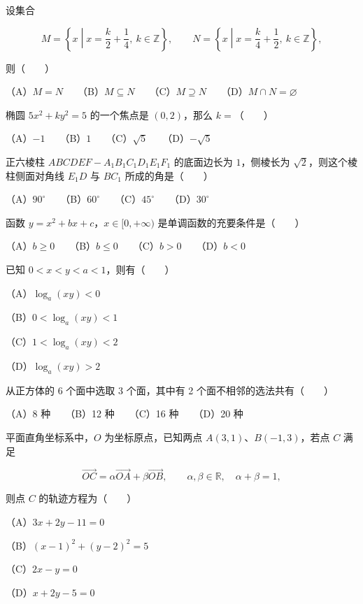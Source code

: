 \begin{question}
设集合

\nopagebreak[4]
\[
M=\left\{x\middle|x=\frac{k}{2}+\frac14,\ k\in\mathbb Z\right\},\qquad
N=\left\{x\middle|x=\frac{k}{4}+\frac12,\ k\in\mathbb Z\right\},
\]

则\mbox{（　　）}

（A）$M=N$　　（B）$M\subseteq N$　　（C）$M\supseteq N$　　（D）$M\cap N=\varnothing$

\end{question}
\begin{question}
椭圆 $5x^2+ky^2=5$ 的一个焦点是 $(0,2)$，那么 $k=$\mbox{（　　）}

（A）$-1$　　（B）$1$　　（C）$\sqrt5$　　（D）$-\sqrt5$

\end{question}
\begin{question}
正六棱柱 $ABCDEF-A_1B_1C_1D_1E_1F_1$ 的底面边长为 $1$，侧棱长为 $\sqrt2$，则这个棱柱侧面对角线 $E_1D$ 与 $BC_1$ 所成的角是\mbox{（　　）}

（A）$90^\circ$　　（B）$60^\circ$　　（C）$45^\circ$　　（D）$30^\circ$

\end{question}
\begin{question}
函数 $y=x^2+bx+c$，$x\in[0,+\infty)$ 是单调函数的充要条件是\mbox{（　　）}

（A）$b\geqslant0$　　（B）$b\leqslant0$　　（C）$b>0$　　（D）$b<0$

\end{question}
\begin{question}
已知 $0<x<y<a<1$，则有\mbox{（　　）}

（A）$\log_a(xy)<0$

（B）$0<\log_a(xy)<1$

（C）$1<\log_a(xy)<2$

（D）$\log_a(xy)>2$

\end{question}
\begin{question}
从正方体的 6 个面中选取 3 个面，其中有 2 个面不相邻的选法共有\mbox{（　　）}

（A）8 种　　（B）12 种　　（C）16 种　　（D）20 种

\end{question}
\begin{question}
平面直角坐标系中，$O$ 为坐标原点，已知两点 $A(3,1)\text{、}B(-1,3)$，若点 $C$ 满足

\nopagebreak[4]
\[
\overrightarrow{OC}=\alpha\overrightarrow{OA}+\beta\overrightarrow{OB},
\qquad \alpha,\beta\in\mathbb R,\quad \alpha+\beta=1,
\]

则点 $C$ 的轨迹方程为\mbox{（　　）}

（A）$3x+2y-11=0$

（B）$(x-1)^2+(y-2)^2=5$

（C）$2x-y=0$

（D）$x+2y-5=0$

\end{question}

